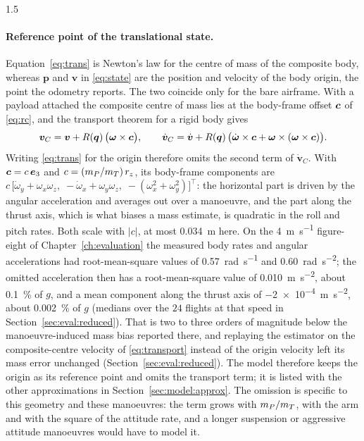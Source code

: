 \begin{spacing}{1.5}
\paragraph{Reference point of the translational state.}\label{sec:model:refpoint}
Equation~\eqref{eq:trans} is Newton's law for the centre of mass of the
composite body, whereas $\bm p$ and $\bm v$ in \eqref{eq:state} are the position
and velocity of the body origin, the point the odometry reports. The two
coincide only for the bare airframe. With a payload attached the composite
centre of mass lies at the body-frame offset $\bm{c}$ of \eqref{eq:rc}, and the
transport theorem for a rigid body gives
\begin{equation}
\bm v_{C} = \bm v + R(\bm q)\,\bigl(\bm\omega\times\bm{c}\bigr),
\qquad
\dot{\bm v}_{C} = \dot{\bm v} + R(\bm q)\,\bigl(\dot{\bm\omega}\times\bm{c}
+ \bm\omega\times(\bm\omega\times\bm{c})\bigr).
\label{eq:transport}
\end{equation}
Writing \eqref{eq:trans} for the origin therefore omits the second term of
$\dot{\bm v}_C$. With $\bm{c}=c\,\bm{e}_3$ and $c=(m_P/m_T)\,r_z$, its body-frame
components are
$c\,\bigl[\dot\omega_y+\omega_x\omega_z,\; -\dot\omega_x+\omega_y\omega_z,\;
-(\omega_x^2+\omega_y^2)\bigr]^{\!\top}$: the horizontal part is driven by the
angular acceleration and averages out over a manoeuvre, and the part along the
thrust axis, which is what biases a mass estimate, is quadratic in the roll and
pitch rates. Both scale with $|c|$, at most \SI{0.034}{\meter} here. On the
\SI{4}{\meter\per\second} figure-eight of Chapter~\ref{ch:evaluation} the
measured body rates and angular accelerations had root-mean-square values of
\SI{0.57}{\radian\per\second} and \SI{0.60}{\radian\per\second\squared}; the
omitted acceleration then has a root-mean-square value of
\SI{0.010}{\meter\per\second\squared}, about \SI{0.1}{\percent} of $g$, and a mean
component along the thrust axis of
\SI{-2e-4}{\meter\per\second\squared}, about \SI{0.002}{\percent} of $g$ (medians
over the $24$ flights at that speed in Section~\ref{sec:eval:reduced}). That is two
to three orders of magnitude below the manoeuvre-induced mass bias reported
there, and replaying the estimator on the composite-centre velocity of
\eqref{eq:transport} instead of the origin velocity left its mass error
unchanged (Section~\ref{sec:eval:reduced}). The model therefore keeps the origin
as its reference point and omits the transport term; it is listed with the other
approximations in Section~\ref{sec:model:approx}. The omission is specific to
this geometry and these manoeuvres: the term grows with $m_P/m_T$, with the arm
and with the square of the attitude rate, and a longer suspension or aggressive
attitude manoeuvres would have to model it.


\end{spacing}
